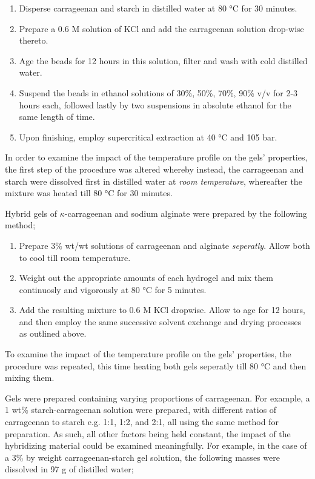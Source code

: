 \documentclass[a4paper,12pt]{article}
\begin{document}
\begin{enumerate}
	\item Disperse carrageenan and starch in distilled water at 80 °C for 30 minutes.
	\item Prepare a 0.6 M solution of KCl and add the carrageenan solution drop-wise thereto.
	\item Age the beads for 12 hours in this solution, filter and wash with cold distilled water.
	\item Suspend the beads in ethanol solutions of 30\%, 50\%, 70\%, 90\% v/v for 2-3 hours each, followed lastly by two suspensions in absolute ethanol for the same length of time.
	\item Upon finishing, employ supercritical extraction at 40 °C and 105 bar.   
\end{enumerate}

In order to examine the impact of the temperature profile on the gels' properties, the first step of the procedure was altered whereby instead, the carrageenan and starch were dissolved first in distilled water at \emph{room temperature}, whereafter the mixture was heated till 80 °C for 30 minutes.

Hybrid gels of $\kappa$-carrageenan and sodium alginate were prepared by the following method;

\begin{enumerate}
  \item Prepare 3\% wt/wt solutions of carrageenan and alginate \emph{seperatly}. Allow both to cool till room temperature.
  \item Weight out the appropriate amounts of each hydrogel and mix them continuosly and vigorously at 80 °C for 5 minutes.
  \item Add the resulting mixture to 0.6 M KCl dropwise. Allow to age for 12 hours, and then employ the same successive solvent exchange and drying processes as outlined above.
\end{enumerate}

To examine the impact of the temperature profile on the gels' properties, the procedure was repeated, this time heating both gels seperatly till 80 °C and then mixing them.

Gels were prepared containing varying proportions of carrageenan. For example, a 1 wt\% starch-carrageenan solution were prepared, with different ratios of carrageenan to starch e.g. 1:1, 1:2, and 2:1, all using the same method for preparation. As such, all other factors being held constant, the impact of the hybridizing material could be examined meaningfully. For example, in the case of a 3\% by weight carrageenan-starch gel solution, the following masses were dissolved in 97 g of distilled water;
\end{document}
